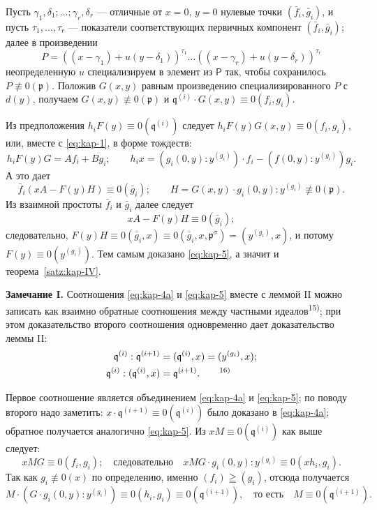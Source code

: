 \documentclass[11pt]{article}
\theoremstyle{plain}
\begin{document}
Пусть $\gamma_{1}, \delta_{1}; \ldots; \gamma_{r}, \delta_{r}$ ---
отличные от $x = 0$, $y = 0$ нулевые точки
$(\bar{f}_{i}, \bar{g}_{i})$, и пусть
$\tau_{1}, \ldots, \tau_{r}$ --- показатели соответствующих
первичных компонент $(\bar{f}_{i}, \bar{g}_{i})$; далее в произведении
\[
P = ((x-\gamma_{1}) + u(y-\delta_{1}))^{\tau_{1}} \ldots
((x-\gamma_{r}) + u(y-\delta_{r}))^{\tau_{r}}
\]
неопределенную $u$ специализируем в элемент из $\mathsf{P}$ так, чтобы
сохранилось $P \not\equiv 0(\mathfrak{p})$. Положив $G(x,y)$ равным
произведению специализированного $P$ с $d(y)$, получаем
$G(x,y) \not\equiv 0(\mathfrak{p})$ и
$\mathfrak{q}^{(i)} \cdot G(x,y) \equiv 0(f_{i}, g_{i})$.

Из предположения $h_{i}F(y) \equiv 0(\mathfrak{q}^{(i)})$ следует
$h_{i}F(y)G(x,y) \equiv 0(f_{i}, g_{i})$, или, вместе с
\eqref{eq:kap-1}, в форме тождеств:
\[
h_{i}F(y)G = Af_{i} + Bg_{i}; \qquad
h_{i}x = (g_{i}(0,y):y^{(g_{i})})\cdot f_{i}
       - (f(0,y):y^{(g_{i})})g_{i}.
\]
А это дает
\[
\bar{f}_{i}(xA - F(y)H) \equiv 0(\bar{g}_{i}); \qquad
H = G(x,y) \cdot g_{i}(0,y):y^{(g_{i})} \not\equiv 0(\mathfrak{p}).
\]
Из взаимной простоты $\bar{f}_{i}$ и $\bar{g}_{i}$ далее следует
\[
xA - F(y)H \equiv 0(\bar{g}_{i});
\]
следовательно,
$F(y)H \equiv 0(\bar{g}_{i}, x)
\equiv 0(\bar{g}_{i}, x, \mathfrak{p}^{\sigma})
= (y^{(g_{i})}, x)$, и потому $F(y) \equiv 0(y^{(g_{i})})$.
Тем самым доказано \eqref{eq:kap-5}, а значит и
теорема~\ref{satz:kap-IV}.

\smallskip
\textbf{Замечание I.} Соотношения \eqref{eq:kap-4a} и
\eqref{eq:kap-5} вместе с леммой II можно записать как взаимно
обратные соотношения между частными идеалов\textsuperscript{15)};
при этом доказательство второго соотношения одновременно дает
доказательство леммы II:
\begin{equation}\label{eq:kap-6}
\begin{aligned}
\mathfrak{q}^{(i)} : \mathfrak{q}^{(i+1)}
  &= (\mathfrak{q}^{(i)}, x) = (y^{(g_{i})}, x);\\
\mathfrak{q}^{(i)} : (\mathfrak{q}^{(i)}, x)
  &= \mathfrak{q}^{(i+1)}.\qquad\text{\textsuperscript{16)}}
\end{aligned}
\end{equation}

Первое соотношение является объединением \eqref{eq:kap-4a} и
\eqref{eq:kap-5}; по поводу второго надо заметить:
$x \cdot \mathfrak{q}^{(i+1)} \equiv 0(\mathfrak{q}^{(i)})$ было
доказано в \eqref{eq:kap-4a}; обратное получается аналогично
\eqref{eq:kap-5}. Из $xM \equiv 0(\mathfrak{q}^{(i)})$ как выше
следует:
\[
xMG \equiv 0(f_{i}, g_{i}); \quad \text{следовательно}\quad
xMG \cdot g_{i}(0,y):y^{(g_{i})} \equiv 0(xh_{i}, g_{i}).
\]
Так как $g_{i} \not\equiv 0(x)$ по определению, именно
$(f_i)\geqq(g_i)$, отсюда получается
\[
M \cdot (G \cdot g_{i}(0,y):y^{(g_{i})})
\equiv 0(h_{i}, g_{i}) \equiv 0(\mathfrak{q}^{(i+1)}),
\quad \text{то есть}\quad M \equiv 0(\mathfrak{q}^{(i+1)}).
\]
\end{document}
